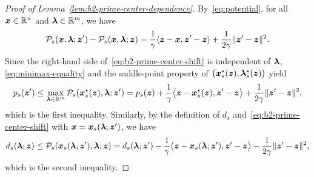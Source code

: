 \begin{proof}[Proof of Lemma~\ref{lem:b2-prime-center-dependence}]
By~\eqref{eq:potential}, for all \(\bm{x}\in\mathbb{R}^n\) and \(\bm{\lambda}\in\mathbb{R}^m\), we
have
\begin{equation}
    \mathcal P_s(\bm{x},\bm{\lambda};\bm{z}')-\mathcal P_s(\bm{x},\bm{\lambda};\bm{z})
    =\frac{1}{\gamma}\langle\bm{z}-\bm{x},\bm{z}'-\bm{z}\rangle
    +\frac{1}{2\gamma}\|\bm{z}'-\bm{z}\|^2 .
    \label{eq:b2-prime-center-shift}
\end{equation}
Since the right-hand side of~\eqref{eq:b2-prime-center-shift} is independent
of \(\bm{\lambda}\), \eqref{eq:minimax-equality} and the saddle-point property of
\(\bigl(\bm{x}_s^\star(\bm{z}),\bm{\lambda}_s^\star(\bm{z})\bigr)\) yield
\[
    p_s(\bm{z}')
    \le\max_{\bm{\lambda}\in\mathbb{R}^m}\mathcal P_s(\bm{x}_s^\star(\bm{z}),\bm{\lambda};\bm{z}')
    =p_s(\bm{z})+\frac1\gamma\bigl\langle\bm{z}-\bm{x}_s^\star(\bm{z}),\bm{z}'-\bm{z}\bigr\rangle
    +\frac{1}{2\gamma}\|\bm{z}'-\bm{z}\|^2,
\]
which is the first inequality. Similarly, by the definition of \(d_s\)
and~\eqref{eq:b2-prime-center-shift} with \(\bm{x}=\bm{x}_s(\bm{\lambda};\bm{z}')\), we have
\[
    d_s(\bm{\lambda};\bm{z})
    \le\mathcal P_s(\bm{x}_s(\bm{\lambda};\bm{z}'),\bm{\lambda};\bm{z})
    =d_s(\bm{\lambda};\bm{z}')
    -\frac1\gamma\bigl\langle\bm{z}-\bm{x}_s(\bm{\lambda};\bm{z}'),\bm{z}'-\bm{z}\bigr\rangle
    -\frac{1}{2\gamma}\|\bm{z}'-\bm{z}\|^2,
\]
which is the second inequality.


\end{proof}
